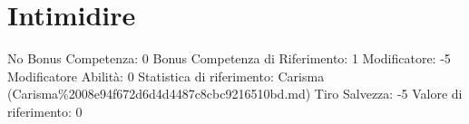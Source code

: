 \section{Intimidire}\label{intimidire}

\begin{description}
\tightlist
\item[Tags: ABI]
No Bonus Competenza: 0 Bonus Competenza di Riferimento: 1 Modificatore:
-5 Modificatore Abilità: 0 Statistica di riferimento: Carisma
(Carisma\%2008e94f672d6d4d4487c8cbc9216510bd.md) Tiro Salvezza: -5
Valore di riferimento: 0
\end{description}
